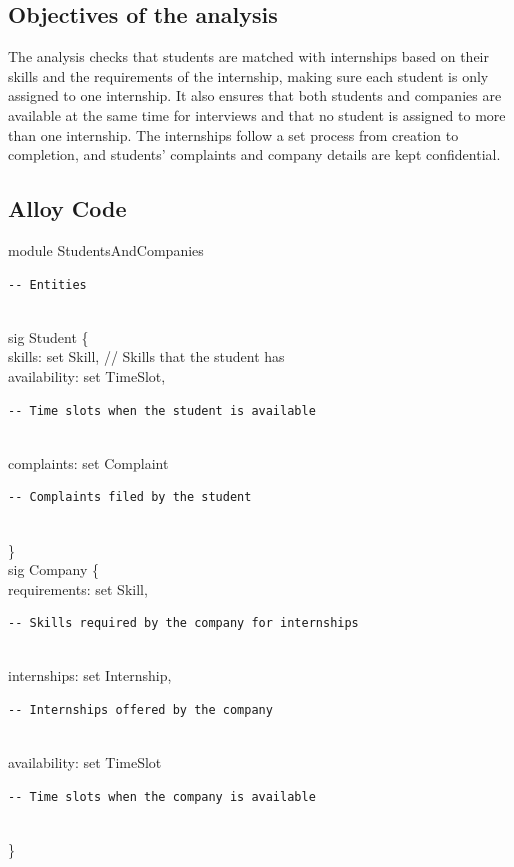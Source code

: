 
\subsection{Objectives of the analysis}
The analysis checks that students are matched with internships based on their skills and the requirements of the internship, making sure each student is only assigned to one internship. It also ensures that both students and companies are available at the same time for interviews and that no student is assigned to more than one internship. The internships follow a set process from creation to completion, and students' complaints and company details are kept confidential.



\subsection{Alloy Code}

module StudentsAndCompanies\\

\begin{verbatim}
-- Entities
\end{verbatim}\\
sig Student \{ \\
  skills: set Skill,         // Skills that the student has \\
  availability: set TimeSlot, \begin{verbatim}
-- Time slots when the student is available
\end{verbatim}\\
  complaints: set Complaint   \begin{verbatim}
-- Complaints filed by the student
\end{verbatim}\\
\} \\

sig Company \{ \\
  requirements: set Skill,   \begin{verbatim}
-- Skills required by the company for internships
\end{verbatim}\\
  internships: set Internship, \begin{verbatim}
-- Internships offered by the company
\end{verbatim}\\
  availability: set TimeSlot  \begin{verbatim}
-- Time slots when the company is available
\end{verbatim}\\
\} \\


